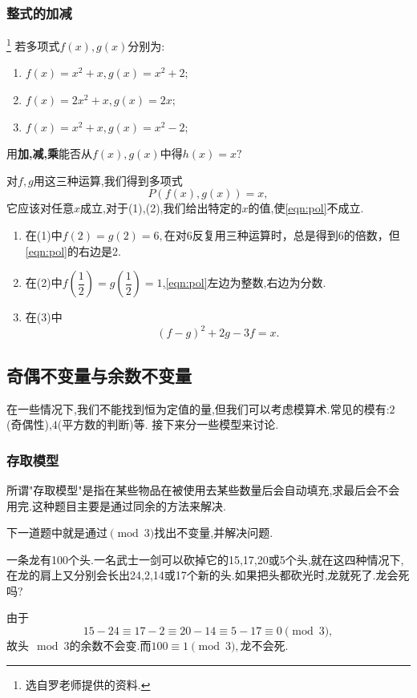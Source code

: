 \subsubsection{整式的加减}
\begin{problem}\footnote{选自罗老师提供的资料.}
    若多项式$f(x),g(x)$分别为:
    \begin{enumerate}
        \item $f(x)=x^2+x,g(x)=x^2+2;$
        \item $f(x)=2x^2+x,g(x)=2x;$
        \item $f(x)=x^2+x,g(x)=x^2-2;$
    \end{enumerate}
    用\textbf{加,减,乘}能否从$f(x),g(x)$中得$h(x)=x?$
\end{problem}
\begin{solution}
    对$f,g$用这三种运算,我们得到多项式\begin{equation}\label{eqn:pol}
        P(f(x),g(x))=x,
    \end{equation}
    它应该对任意$x$成立,对于(1),(2),我们给出特定的$x$的值,使\eqref{eqn:pol}不成立.
    \begin{enumerate}
        \item 在(1)中$f(2)=g(2)=6,$在对6反复用三种运算时，总是得到6的倍数，但\eqref{eqn:pol}的右边是2.
        \item 在(2)中$f(\dfrac{1}{2})=g(\dfrac12)=1$,\eqref{eqn:pol}左边为整数,右边为分数.
        \item 在(3)中$$(f-g)^2+2g-3f=x.$$
    \end{enumerate}
    
    
\end{solution}
\subsection{奇偶不变量与余数不变量}
在一些情况下,我们不能找到恒为定值的量,但我们可以考虑模算术.常见的模有:$2$(奇偶性),$4$(平方数的判断)等.
接下来分一些模型来讨论.
\subsubsection{存取模型}
所谓"存取模型"是指在某些物品在被使用去某些数量后会自动填充,求最后会不会用完.这种题目主要是通过同余的方法来解决.

下一道题中就是通过$\pmod 3$找出不变量,并解决问题.
\begin{problem}
    一条龙有100个头.一名武士一剑可以砍掉它的15,17,20或5个头,就在这四种情况下,在龙的肩上又分别会长出24,2,14或17个新的头.如果把头都砍光时,龙就死了.龙会死吗?
\end{problem}
\begin{solution}
    \songti
    由于$$15-24\equiv 17-2\equiv 20-14\equiv 5-17\equiv 0\pmod3,$$故头$\mod 3$的余数不会变.而$100\equiv 1\pmod3,$龙不会死.
\end{solution}

